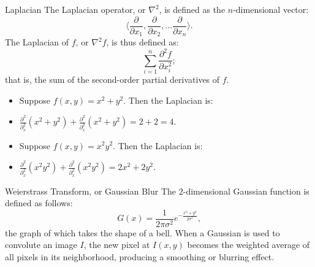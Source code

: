 \documentclass[xcolor=dvipsnames]{beamer}
\begin{document}
\begin{frame}[label=math-laplacian]{Laplacian}
 The Laplacian operator, or $\nabla^2$, is defined as the $n$-dimensional vector:
 \begin{equation}
  \langle 
   \frac{\partial}{\partial x_1},
   \frac{\partial}{\partial x_2}, \ldots
   \frac{\partial}{\partial x_n}
  \rangle.
 \end{equation}
 The Laplacian of $f$, or $\nabla^2 f$, is thus defined as:
 \begin{equation}
  \sum_{i=1}^n \frac{\partial^2 f}{\partial x_i^2};
 \end{equation}
 that is, the sum of the second-order partial derivatives of $f$.
\end{frame}

\begin{frame}
 \begin{itemize} 
 \item Suppose $f(x,y) = x^2 + y^2$. Then the Laplacian is:
 \item $\frac{\partial^2}{\partial^2_x} 
       (x^2 + y^2) +
        \frac{\partial^2}{\partial^2_x} 
       (x^2 + y^2) = 2+ 2 = 4$.
 \vspace{16pt}  
 \item Suppose $f(x,y) = x^2y^2$. Then the Laplacian is:
 \item $\frac{\partial^2}{\partial^2_x} 
       (x^2y^2) +
        \frac{\partial^2}{\partial^2_x} 
       (x^2y^2) = 2x^2 + 2y^2$.
 \end{itemize} 
\end{frame}


\begin{frame}[label=math-weierstrass]{Weierstrass Transform, or Gaussian Blur}
 The 2-dimensional Gaussian function is defined as follows:
 \begin{equation}
  G(x) = \frac{1}{2 \pi \sigma^2} e^{-\frac{x^2+y^2}{2\sigma^2}},
 \end{equation}
 the graph of which takes the shape of a bell. When a Gaussian is used to convolute an image $I$, the new pixel at $I(x,y)$ becomes the weighted average of all pixels in its neighborhood, producing a smoothing or blurring effect.
\end{frame}
\end{document}
